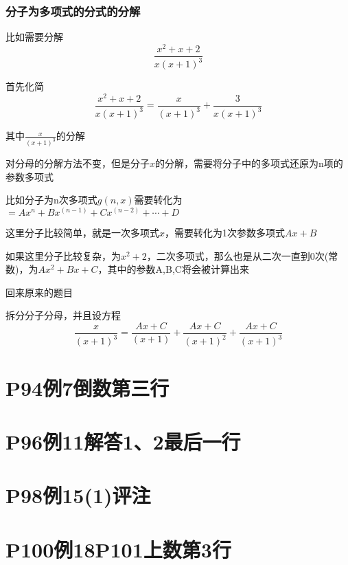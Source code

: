 \documentclass[a4paper]{ctexart}
\begin{document}
\begin{multicols}{2}
\subsubsection{分子为多项式的分式的分解}
\par 比如需要分解
\begin{equation}
\frac{x^2+x+2}
{x(x+1)^3}
\end{equation}
\par 首先化简
\begin{equation}
\frac{x^2+x+2}
{x(x+1)^3}
=
\frac{x}
{(x+1)^3}
+
\frac{3}
{x(x+1)^3}
\end{equation}
\par 其中$\frac{x}{(x+1)^3}$的分解
\par 对分母的分解方法不变，但是分子$x$的分解，需要将分子中的多项式还原为n项的参数多项式
\par 比如分子为n次多项式$g(n,x)$需要转化为$ = Ax^n + Bx^{(n-1)} + Cx^{(n-2)} + \cdots + D$
\par 这里分子比较简单，就是一次多项式$x$，需要转化为1次参数多项式$Ax + B$
\par 如果这里分子比较复杂，为$x^2+2$，二次多项式，那么也是从二次一直到0次(常数)，为$Ax^2+Bx+C$，其中的参数A,B,C将会被计算出来
\par 回来原来的题目
\par 拆分分子分母，并且设方程
\begin{equation}
\frac{x}
{(x+1)^3}
=
\frac{Ax+C}{(x+1)}
+
\frac{Ax+C}{(x+1)^2}
+
\frac{Ax+C}{(x+1)^3}
\end{equation}













\section{P94例7倒数第三行}

\section{P96例11解答1、2最后一行}

\section{P98例15(1)评注}

\section{P100例18P101上数第3行}


\end{multicols}
\end{document}
